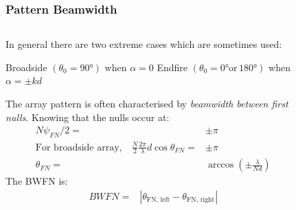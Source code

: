 \documentclass[10pt]{beamer}
\begin{document}
\begin{frame}
    \frametitle{Pattern Beamwidth}
    \begin{columns}[T] %
        \begin{column}{.6\textwidth}
            In general there are two extreme cases which are sometimes used:
            \begin{outline}[enumerate]
                \1 Broadside $(\theta_0 = \ang{90})$ when $\alpha = 0$
                \1 Endfire $(\theta_0 = \ang{0} \text{or} \, \ang{180})$ when $\alpha = \pm k d$
            \end{outline}
The array pattern is often characterised by \textit{beamwidth between first nulls}. Knowing that the nulls occur at:
\small
\begin{align*}
    N \psi_{FN} /2 {}=& \pm \pi \\
    \text{For broadside array,} \quad \frac{N}{2} \frac{2\pi}{\lambda} d \cos \theta_{FN}  {}=& \pm \pi \\
    \theta_{FN} {}=& \arccos \left(\pm \frac{\lambda}{N d}\right)
\end{align*}
The BWFN is:
\begin{align*}
    BWFN {}=& \left| \theta_{\text{FN, left}} - \theta_{\text{FN, right}} \right|
\end{align*}
\normalsize
        \end{column}
        \begin{column}{.5\textwidth}
            \begin{figure}[t!]
                \centering
                \\
              \end{figure}
        \end{column}%
    \end{columns}


\end{frame}
\end{document}
